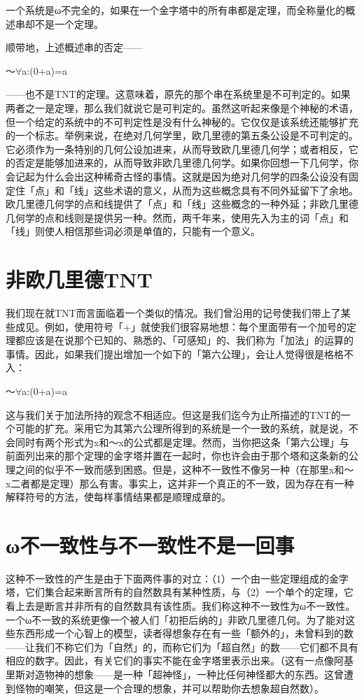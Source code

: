 \documentclass[
  12pt,
  twoside,
  openright,
  oldfontcommands,
]{memoir}
\begin{document}
{一个系统是ω不完全的，如果在一个金字塔中的所有串都是定理，而全称量化的概述串却不是一个定理。}

顺带地，上述概述串的否定------

～$\forall$a:(0+a)=a

------也不是TNT的定理。这意味着，原先的那个串在系统里是不可判定的。如果两者之一是定理，那么我们就说它是可判定的。虽然这听起来像是个神秘的术语，但一个给定的系统中的不可判定性是没有什么神秘的。它仅仅是该系统还能够扩充的一个标志。举例来说，在绝对几何学里，欧几里德的第五条公设是不可判定的。它必须作为一条特别的几何公设加进来，从而导致欧几里德几何学；或者相反，它的否定是能够加进来的，从而导致非欧几里德几何学。如果你回想一下几何学，你会记起为什么会出这种稀奇古怪的事情。这就是因为绝对几何学的四条公设没有固定住「点」和「线」这些术语的意义，从而为这些概念具有不同外延留下了余地。欧几里德几何学的点和线提供了「点」和「线」这些概念的一种外延；非欧几里德几何学的点和线则是提供另一种。然而，两千年来，使用先入为主的词「点」和「线」则使人相信那些词必须是单值的，只能有一个意义。

\section{非欧几里德TNT}

我们现在就TNT而言面临着一个类似的情况。我们曾沿用的记号使我们带上了某些成见。例如，使用符号「+」就使我们很容易地想：每个里面带有一个加号的定理都应该是在说那个已知的、熟悉的、「可感知」的、我们称为「加法」的运算的事情。因此，如果我们提出增加一个如下的「第六公理」，会让人觉得很是格格不入：

～$\forall$a:(0+a)=a

这与我们关于加法所持的观念不相适应。但这是我们迄今为止所描述的TNT的一个可能的扩充。采用它为其第六公理所得到的系统是一个一致的系统，就是说，不会同时有两个形式为x和～x的公式都是定理。然而，当你把这条「第六公理」与前面列出来的那个定理的金字塔并置在一起时，你也许会由于那个塔和这条新的公理之间的似乎不一致而感到困惑。但是，这种不一致性不像另一种（在那里x和～x二者都是定理）那么有害。事实上，这并非一个真正的不一致，因为存在有一种解释符号的方法，使每样事情结果都是顺理成章的。

\section{ω不一致性与不一致性不是一回事}

这种不一致性的产生是由于下面两件事的对立：（1）一个由一些定理组成的金字塔，它们集合起来断言所有的自然数具有某种性质，与（2）一个单个的定理，它看上去是断言并非所有的自然数具有该性质。我们称这种不一致性为ω不一致性。一个ω不一致的系统更像一个被人们「初拒后纳的」非欧几里德几何。为了能对这些东西形成一个心智上的模型，读者得想象存在有一些「额外的」，未曾料到的数------让我们不称它们为「自然」的，而称它们为「超自然」的数------它们都不具有相应的数字。因此，有关它们的事实不能在金字塔里表示出来。（这有一点像阿基里斯对造物神的想象------是一种「超神怪」，一种比任何神怪都大的东西。这曾遭到怪物的嘲笑，但这是一个合理的想象，并可以帮助你去想象超自然数）。
\end{document}
